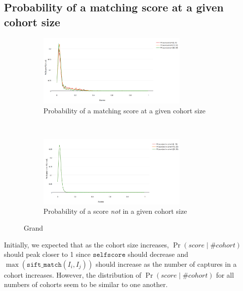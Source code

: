 
\subsection{Probability of a matching score at a given cohort size}

\begin{figure}[htbp]
    \centering
    \begin{subfigure}[t]{\textwidth}
        \centering
        \includegraphics[width=0.8\textwidth]{dataset/grand/pscohort}
        \caption{Probability of a matching score at a given cohort size}
        \label{fig:grand_pscohort} %
    \end{subfigure}%
    \\
    \begin{subfigure}[t]{\textwidth}
        \centering
        \includegraphics[width=0.8\textwidth]{dataset/grand/psnoncohort}
        \caption{Probability of a score \emph{not} in a given cohort size}
        \label{fig:grand_psnoncohort} %
    \end{subfigure}%
    \caption{Grand}
    \label{fig:grand_psc} %
\end{figure}

Initially, we expected that as the cohort size increases, $\Pr{(score \mid
\#cohort)}$ should peak closer to 1 since $\texttt{selfscore}$ should decrease
and $\max{(\texttt{sift\_match}(I_i, I_j))}$ should increase as the number of
captures in a cohort increases. However, the distribution of $\Pr{(score \mid
\#cohort)}$ for all numbers of cohorts seem to be similar to one another.

